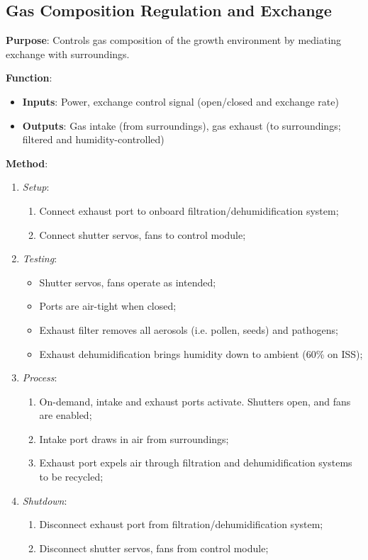 \subsection{Gas Composition Regulation and Exchange}
\label{sec:gas}

\textbf{Purpose}: Controls gas composition of the growth environment by mediating exchange with surroundings.

\textbf{Function}:
\begin{itemize}
    \item \textbf{Inputs}: Power, exchange control signal (open/closed and exchange rate)
    \item \textbf{Outputs}: Gas intake (from surroundings), gas exhaust (to surroundings; filtered and humidity-controlled)
\end{itemize}

\textbf{Method}:
\begin{enumerate}
    \item \textit{Setup}:
    \begin{enumerate}
        \item Connect exhaust port to onboard filtration/dehumidification system;
        \item Connect shutter servos, fans to control module;
    \end{enumerate}
    \item \textit{Testing}:
    \begin{itemize}
        \item Shutter servos, fans operate as intended;
        \item Ports are air-tight when closed;
        \item Exhaust filter removes all aerosols (i.e. pollen, seeds) and pathogens;
        \item Exhaust dehumidification brings humidity down to ambient (60\% on ISS); %
    \end{itemize}
    \item \textit{Process}:
    \begin{enumerate}
        \item On-demand, intake and exhaust ports activate. Shutters open, and fans are enabled;
        \item Intake port draws in air from surroundings;
        \item Exhaust port expels air through filtration and dehumidification systems to be recycled;
    \end{enumerate}
    \item \textit{Shutdown}:
    \begin{enumerate}
        \item Disconnect exhaust port from filtration/dehumidification system;
        \item Disconnect shutter servos, fans from control module;
    \end{enumerate}
\end{enumerate}

